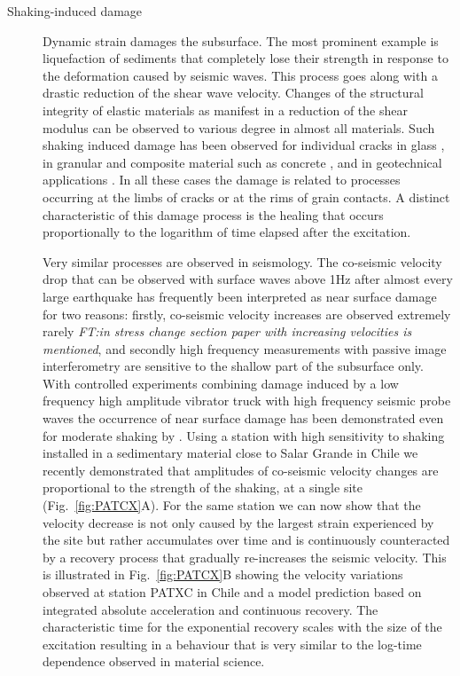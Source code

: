 \documentclass[11pt]{article}
\newcommand{\noteft}[1]{{\it \color{magenta} FT:#1}}
\newcommand{\noteft}[1]{}
\begin{document}
\begin{description}
\item[Shaking-induced damage]
Dynamic strain damages the subsurface. The most prominent example is liquefaction of sediments that completely lose their strength in response to the deformation caused by seismic waves. This process goes along with a drastic reduction of the shear wave velocity. Changes of the structural integrity of elastic materials as manifest in a reduction of the shear modulus can be observed to various degree in almost all materials. Such shaking induced damage has been observed for individual cracks in glass \citep{Zaitsev2003}, in granular \citep{Josserand2000} and composite material such as concrete \citep{TenCate2000, Tremblay2010}, and in geotechnical applications \citep{Mainsant2012a}. In all these cases the damage is related to processes occurring at the limbs of cracks or at the rims of grain contacts. A distinct characteristic of this damage process is the healing that occurs proportionally to the logarithm of time elapsed after the excitation.

Very similar processes are observed in seismology. The co-seismic velocity drop that can be observed with surface waves above 1Hz  after almost every large earthquake has frequently been interpreted as near surface damage for two reasons: firstly, co-seismic velocity increases are observed extremely rarely\noteft{in stress change section paper with increasing velocities is mentioned}, and secondly high frequency measurements with passive image interferometry are sensitive to the shallow part of the subsurface only. With controlled experiments combining damage induced by a low frequency high amplitude vibrator truck with high frequency seismic probe waves the occurrence of near surface damage has been demonstrated even for moderate shaking by \citet{Johnson2009}. Using a station with high sensitivity to shaking installed in a sedimentary material close to Salar Grande in Chile we recently demonstrated that amplitudes of co-seismic velocity changes are proportional to the strength of the shaking, at a single site \citep{Richter2014} (Fig.~\ref{fig:PATCX}A). For the same station we can now show that the velocity decrease is not only caused by the largest strain experienced by the site but rather accumulates over time and is continuously counteracted by a recovery process that gradually re-increases the seismic velocity. This is illustrated in Fig.~\ref{fig:PATCX}B  showing the velocity variations observed at station PATXC in Chile and a model prediction based on integrated absolute acceleration and continuous recovery. The characteristic time for the exponential recovery scales with the size of the excitation resulting in a behaviour that is very similar to the log-time dependence observed in material science.


\end{description}
\end{document}
